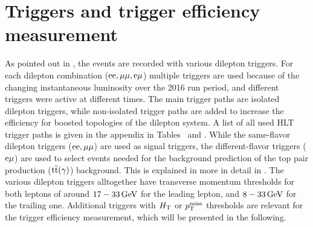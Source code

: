 \section{Triggers and trigger efficiency measurement}\label{sec:triggEff}
As pointed out in , the events are recorded with various dilepton triggers. For each dilepton combination ($\mathrm{e}\mathrm{e},{\mu}{\mu},\mathrm{e}{\mu}$) multiple triggers are used because of the changing instantaneous luminosity over the 2016 run period, and different triggers were active at different times. The main trigger paths are isolated dilepton triggers, while non-isolated trigger paths are added to increase the efficiency for boosted topologies of the dilepton system. A list of all used HLT trigger paths is given in the appendix in Tables~ and . While the same-flavor dilepton triggers ($\mathrm{e}\mathrm{e},{\mu}{\mu}$) are used as signal triggers, the different-flavor triggers ($\mathrm{e}{\mu}$) are used to select events needed for the background prediction of the top pair production (${\mathrm{t}\overline{\mathrm{t}}}(\gamma)$) background. This is explained in more in detail in . The various dilepton triggers alltogether have transverse momentum thresholds for both leptons of around $17-33\,\text{Ge\hspace{-.08em}V}$ for the leading lepton, and $8-33\,\text{Ge\hspace{-.08em}V}$ for the trailing one. Additional triggers with $H_{\mathrm{T}}$ or $p_{\mathrm{T}}^\text{miss}$ thresholds are relevant for the trigger efficiency measurement, which will be presented in the following.
